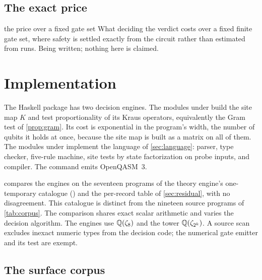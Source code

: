 \documentclass[acmsmall,screen,review,anonymous,nonacm]{acmart}
\begin{document}
\subsection{The exact price}

\begin{planned}{the price over a fixed gate set}
What deciding the verdict costs over a fixed finite gate set, where safety is
settled exactly from the circuit rather than estimated from runs.
Being written; nothing here is claimed.
\end{planned}

\section{Implementation}\label{sec:eval}

The Haskell package has two decision engines.
The modules under  build the site map $K$ and test proportionality of
its Kraus operators, equivalently the Gram test of \cref{prop:gram}.
Its cost is exponential in the program's width, the number of qubits it holds
at once, because the site map is built as a matrix on all of them.
The modules under  implement the language of \cref{sec:language}: parser,
type checker, five-rule machine, site tests by state factorization on
probe inputs, and compiler. The command
 emits OpenQASM~3.

 compares the engines on the seventeen programs of
the theory engine's one-temporary catalogue () and the
per-record table of \cref{sec:residual}, with no disagreement. This catalogue
is distinct from the nineteen source programs of \cref{tab:corpus}.
The comparison shares exact scalar arithmetic and varies the decision
algorithm. The engines use $\mathbb{Q}(\zeta_8)$ and the tower $\mathbb{Q}(\zeta_{2^k})$.
A source scan excludes inexact numeric types from the decision code;
the numerical gate emitter and its test are exempt.

\subsection{The surface corpus}\label{sec:eval:corpus}
\end{document}
